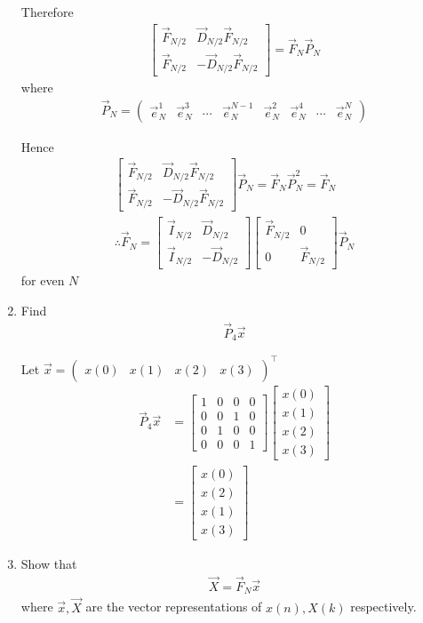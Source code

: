 \documentclass[journal,12pt,twocolumn]{IEEEtran}
\newcommand{\myvec}[1]{\ensuremath{\begin{pmatrix}#1\end{pmatrix}}}
\newcommand{\mymat}[1]{\ensuremath{\begin{bmatrix}#1\end{bmatrix}}}
\renewcommand\thesection{\arabic{section}}
\begin{document}
\begin{enumerate}[label=\thesection.\arabic*]
Therefore
\begin{align}
	\mymat{\vec{F}_{N/2} & \vec{D}_{N/2}\vec{F}_{N/2} \\ \vec{F}_{N/2} & -\vec{D}_{N/2}\vec{F}_{N/2}} = \vec{F}_N \vec{P}_N
\end{align}
where 
\begin{align}
	\vec{P}_N = \myvec{\vec{e}_N^1 & \vec{e}_N^3 & \cdots & \vec{e}_N^{N-1} & \vec{e}_N^2 & \vec{e}_N^4 & \cdots & \vec{e}_N^N}
\end{align}

Hence
\begin{align}
	\mymat{\vec{F}_{N/2} & \vec{D}_{N/2}\vec{F}_{N/2} \\ \vec{F}_{N/2} & -\vec{D}_{N/2}\vec{F}_{N/2}} \vec{P}_N = \vec{F}_N \vec{P}_N^2 = \vec{F}_N \\
	\therefore \vec{F}_N = \mymat{\vec{I}_{N/2} & \vec{D}_{N/2} \\ \vec{I}_{N/2} & -\vec{D}_{N/2}} \mymat{\vec{F}_{N/2} & 0 \\ 0 & \vec{F}_{N/2}} \vec{P}_N
\end{align}
for even $N$

\item Find 
\begin{align}
	 \vec{P}_4 \vec{x}
\end{align}

\solution Let $\vec{x} = \myvec{x(0) & x(1) & x(2) & x(3)}^\top$
\begin{align}
	\vec{P}_4 \vec{x} &= \mymat{1 & 0 & 0 & 0 \\ 0 & 0 & 1 & 0 \\ 0 & 1 & 0 & 0 \\ 0 & 0 & 0 & 1} \mymat{x(0) \\ x(1) \\ x(2) \\ x(3)} \\
	&= \mymat{x(0) \\ x(2) \\ x(1) \\ x(3)}
\end{align}

\item Show that 
\begin{align}
	\vec{X} = \vec{F}_N \vec{x}
	\label{eq:dft-mat-def}
\end{align}
	where $\vec{x}, \vec{X}$ are the vector representations of $x(n), X(k)$ respectively.
	

\end{enumerate}
\end{document}
